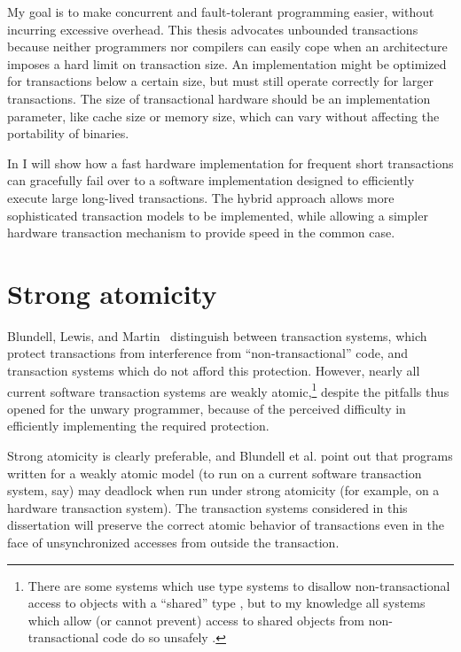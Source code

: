 My goal is to
make concurrent and fault-tolerant programming easier,
without incurring excessive overhead.  This thesis advocates
unbounded transactions because neither programmers nor compilers can
easily cope when an architecture imposes a hard limit on transaction
size.  An implementation might be optimized for transactions below a
certain size, but must still operate correctly for larger
transactions.  The size of transactional hardware should be an
implementation parameter, like cache size or memory size, which can
vary without affecting the portability of binaries.

In  I will show how a fast hardware implementation for
frequent short transactions can gracefully fail over to a software
implementation designed to efficiently execute large long-lived
transactions.
The hybrid approach allows more sophisticated transaction models to be
implemented, while allowing a simpler hardware transaction mechanism
to provide speed in the common case.

\section{Strong atomicity}\label{sec:strongatom}
Blundell, Lewis, and Martin~\cite{BlundellLeMa05} distinguish
between 
transaction systems, which protect transactions from interference from
``non-transactional'' code, and  transaction
systems which do not afford this
 protection.
However, nearly all current software transaction systems are weakly
atomic,\footnote{ There are some systems which use type systems to
disallow non-transactional access to objects with a ``shared'' type
\cite{RudysWa02, HerlihyLuMoSc03, HarrisMaPeHe05}, but to my knowledge
all systems which allow (or cannot prevent) access to shared objects
from non-transactional code do so unsafely
\cite{ShavitTo95,HarrisFr03,Herlihy05b,DiceShSh06,HerlihyLuMo06,FraserHa04}.}
despite the pitfalls thus opened for the unwary programmer, because of
the perceived difficulty in efficiently implementing the required
protection.

Strong atomicity is clearly preferable, and Blundell et al. point out
that programs written for a weakly atomic model (to run on a current software
transaction system, say) may deadlock when run under strong atomicity
(for example, on a hardware transaction system).  The transaction
systems considered in this dissertation will preserve the
correct atomic behavior of transactions even in the face of
unsynchronized accesses from outside the transaction.


